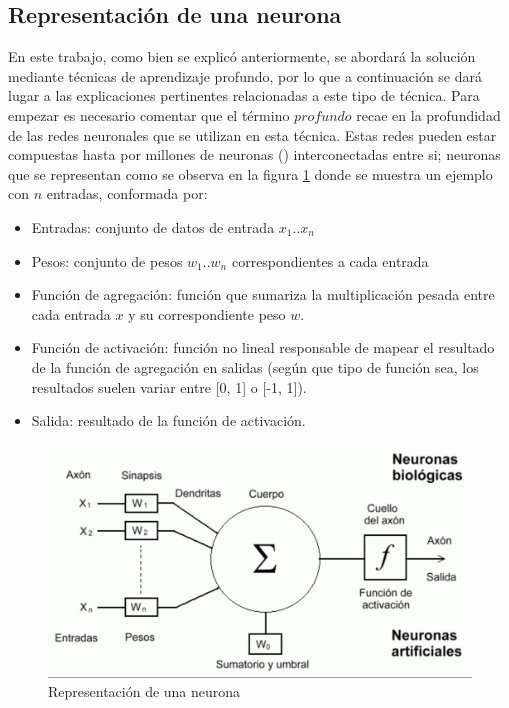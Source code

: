 \subsection{Representación de una neurona}

 En este trabajo, como bien se explicó anteriormente, se abordará la solución mediante técnicas de aprendizaje profundo, por lo que a continuación se dará lugar a las explicaciones pertinentes relacionadas a este tipo de técnica.
 Para empezar es necesario comentar que el término \(profundo\) recae en la profundidad de las redes neuronales que se utilizan en esta técnica. Estas redes pueden estar compuestas hasta por millones de neuronas (\cite{mcculloch1943logical}) interconectadas entre si; neuronas que se representan como se observa en la figura \ref{fig:representacion_neurona} donde se muestra un ejemplo con \(n\) entradas, conformada por: 
 \begin{itemize}
 	\item Entradas: conjunto de datos de entrada \(x_1\)..\(x_n\)
 	\item Pesos: conjunto de pesos \(w_1\)..\(w_n\) correspondientes a cada entrada
 	\item Función de agregación: función que sumariza la multiplicación pesada entre cada entrada \(x\) y su correspondiente peso \(w\).
	\item Función de activación: función no lineal responsable de mapear el resultado de la función de agregación en salidas (según que tipo de función sea, los resultados suelen variar entre [0, 1] o [-1, 1]).
	\item Salida: resultado de la función de activación.
 \end{itemize}
 
 
\begin{figure}[!h]
\centering
\includegraphics[width=.8\linewidth]{images/representacion_neurona}
\caption[Representación de una neurona]{Representación de una neurona \cite{russell2016artificial}}
\label{fig:representacion_neurona}
\end{figure}

